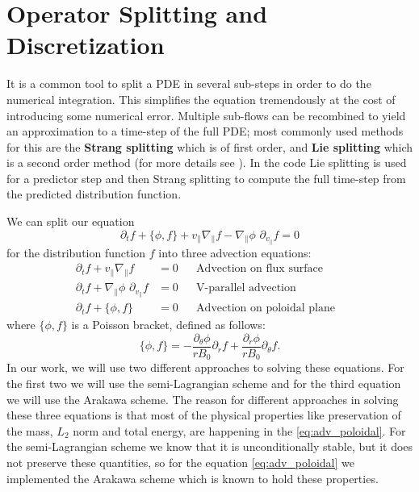 
\section{Operator Splitting and Discretization}
\label{sec:splitting_discretization}

It is a common tool to split a PDE in several sub-steps in order to do the numerical integration. This simplifies the equation tremendously at the cost of introducing some numerical error. Multiple sub-flows can be recombined to yield an approximation to a time-step of the full PDE; most commonly used methods for this are the \textbf{Strang splitting} which is of first order, and \textbf{Lie splitting} which is a second order method (for more details see \cite{emily}). In the code \cite{pygyro_code} Lie splitting is used for a predictor step and then Strang splitting to compute the full time-step from the predicted distribution function.


We can split our equation 
\begin{equation}
 \partial_t f + \{\phi, f \} + v_\parallel \nabla_\parallel f - \nabla_\parallel \phi\,\, \partial_{v_\parallel} f = 0
\end{equation}
for the distribution function $f$ into three advection equations:
\begin{subequations}
	\begin{align}
		\partial_t f + v_\parallel \nabla_\parallel f & = 0 && \text{Advection on flux surface} & \\
		\partial_t f + \nabla_\parallel \phi\,\, \partial_{v_{\parallel}} f & = 0 && \text{V-parallel advection} & \\
		\partial_t f + \{\phi, f\} & = 0 && \text{Advection on poloidal plane} \label{eq:adv_poloidal} &
	\end{align}
\end{subequations}
where $\{\phi,f\}$ is a Poisson bracket, defined as follows:
\begin{equation}
 \{\phi,f\}=-\frac{\partial_\theta\phi}{rB_0}\partial_r f + \frac{\partial_r\phi}{rB_0}\partial_\theta f.
\end{equation}
In our work, we will use two different approaches to solving these equations. For the first two we will use the semi-Lagrangian scheme and for the third equation we will use the Arakawa scheme. The reason for different approaches in solving these three equations is that most of the physical properties like preservation of the mass, $L_2$ norm and total energy, are happening in the \eqref{eq:adv_poloidal}. For the semi-Lagrangian scheme we know that it is unconditionally stable, but it does not preserve these quantities, so for the equation \eqref{eq:adv_poloidal} we implemented the Arakawa scheme which is known to hold these properties.







